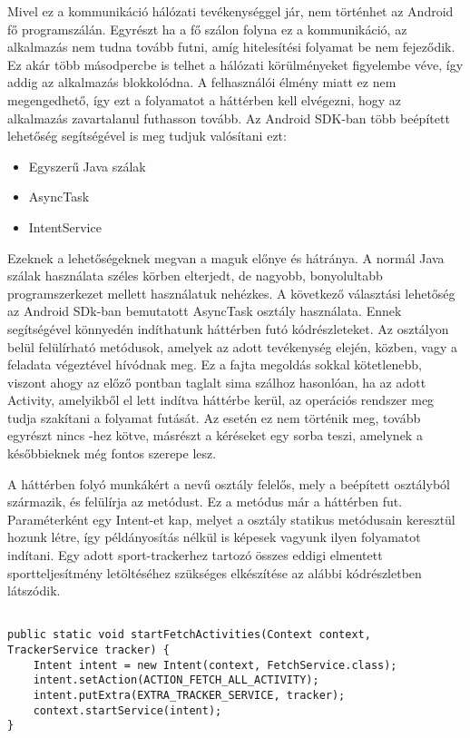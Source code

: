 Mivel ez a kommunikáció hálózati tevékenységgel jár, nem történhet az Android fő programszálán. 
Egyrészt ha a fő szálon folyna ez a kommunikáció, az alkalmazás nem tudna tovább futni, amíg hitelesítési folyamat be nem fejeződik. 
Ez akár több másodpercbe is telhet a hálózati körülményeket figyelembe véve, így addig az alkalmazás blokkolódna. 
A felhasználói élmény miatt ez nem megengedhető, így ezt a folyamatot a háttérben kell elvégezni, hogy az alkalmazás zavartalanul futhasson tovább. 
Az Android SDK-ban több beépített lehetőség segítségével is meg tudjuk valósítani ezt:

\begin{itemize}
	\item Egyszerű Java szálak 
	\item AsyncTask 
	\item IntentService 
\end{itemize}

Ezeknek a lehetőségeknek megvan a maguk előnye és hátránya. 
A normál Java szálak használata széles körben elterjedt, de nagyobb, bonyolultabb programszerkezet mellett használatuk nehézkes. 
A következő választási lehetőség az Android SDk-ban bemutatott AsyncTask osztály használata. 
Ennek segítségével könnyedén indíthatunk háttérben futó kódrészleteket. 
Az osztályon belül felülírható metódusok, amelyek az adott tevékenység elején, közben, vagy a feladata végeztével hívódnak meg. 
Ez a fajta megoldás sokkal kötetlenebb, viszont ahogy az előző pontban taglalt sima szálhoz hasonlóan, ha az adott Activity, amelyikből el lett indítva háttérbe kerül, az operációs rendszer meg tudja szakítani a folyamat futását. 
Az  esetén ez nem történik meg, tovább egyrészt nincs -hez kötve, másrészt a kéréseket egy sorba teszi, amelynek a későbbieknek még fontos szerepe lesz. 

A háttérben folyó munkákért a  nevű osztály felelős, mely a beépített  osztályból származik, és felülírja az  metódust. 
Ez a metódus már a háttérben fut. Paraméterként egy Intent-et kap, melyet a  osztály statikus metódusain keresztül hozunk létre, így példányosítás nélkül is képesek vagyunk ilyen folyamatot indítani. 
Egy adott sport-trackerhez tartozó összes eddigi elmentett sportteljesítmény letöltéséhez szükséges  elkészítése az alábbi kódrészletben látszódik. 

\begin{lstlisting}

public static void startFetchActivities(Context context, TrackerService tracker) {
    Intent intent = new Intent(context, FetchService.class);
    intent.setAction(ACTION_FETCH_ALL_ACTIVITY);
    intent.putExtra(EXTRA_TRACKER_SERVICE, tracker);
    context.startService(intent);
}

\end{lstlisting}

